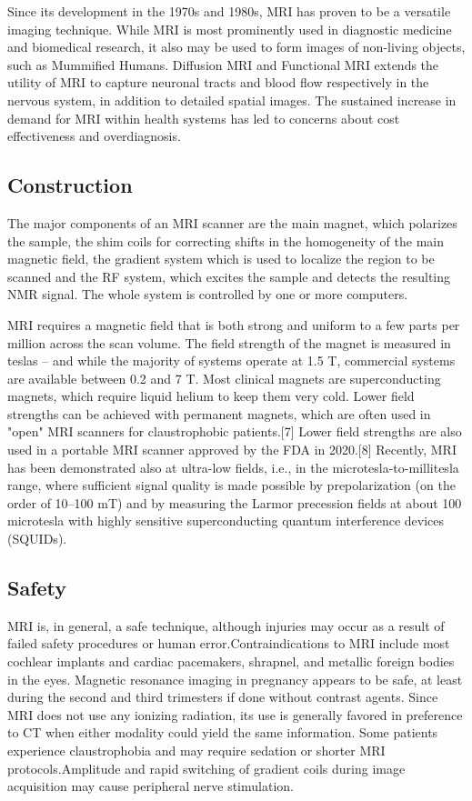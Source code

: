 \documentclass[12pt]{article}
\begin{document}
Since its development in the 1970s and 1980s, MRI has proven to be a versatile imaging technique. While MRI is most prominently used in diagnostic medicine and biomedical research, it also may be used to form images of non-living objects, such as Mummified Humans. Diffusion MRI and Functional MRI extends the utility of MRI to capture neuronal tracts and blood flow respectively in the nervous system, in addition to detailed spatial images. The sustained increase in demand for MRI within health systems has led to concerns about cost effectiveness and overdiagnosis.
\subsection{Construction}
The major components of an MRI scanner are the main magnet, which polarizes the sample, the shim coils for correcting shifts in the homogeneity of the main magnetic field, the gradient system which is used to localize the region to be scanned and the RF system, which excites the sample and detects the resulting NMR signal. The whole system is controlled by one or more computers.

MRI requires a magnetic field that is both strong and uniform to a few parts per million across the scan volume. The field strength of the magnet is measured in teslas – and while the majority of systems operate at 1.5 T, commercial systems are available between 0.2 and 7 T. Most clinical magnets are superconducting magnets, which require liquid helium to keep them very cold. Lower field strengths can be achieved with permanent magnets, which are often used in "open" MRI scanners for claustrophobic patients.[7] Lower field strengths are also used in a portable MRI scanner approved by the FDA in 2020.[8] Recently, MRI has been demonstrated also at ultra-low fields, i.e., in the microtesla-to-millitesla range, where sufficient signal quality is made possible by prepolarization (on the order of 10–100 mT) and by measuring the Larmor precession fields at about 100 microtesla with highly sensitive superconducting quantum interference devices (SQUIDs).
\subsection{Safety}
MRI is, in general, a safe technique, although injuries may occur as a result of failed safety procedures or human error.Contraindications to MRI include most cochlear implants and cardiac pacemakers, shrapnel, and metallic foreign bodies in the eyes. Magnetic resonance imaging in pregnancy appears to be safe, at least during the second and third trimesters if done without contrast agents. Since MRI does not use any ionizing radiation, its use is generally favored in preference to CT when either modality could yield the same information. Some patients experience claustrophobia and may require sedation or shorter MRI protocols.Amplitude and rapid switching of gradient coils during image acquisition may cause peripheral nerve stimulation.
\end{document}
